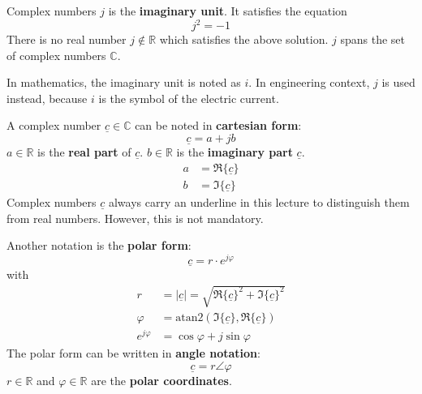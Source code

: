 \begin{refsection}
\begin{excursus}{Complex numbers}
	$j$ is the  \textbf{imaginary unit}. It satisfies the equation
	\begin{equation}
		j^2 = -1
	\end{equation}
	There is no real number $j \notin \mathbb{R}$ which satisfies the above solution. $j$ spans the set of complex numbers $\mathbb{C}$.
	
	In mathematics, the imaginary unit is noted as $i$. In engineering context, $j$ is used instead, because $i$ is the symbol of the electric current.
	
	A complex number $\underline{c} \in \mathbb{C}$ can be noted in  \textbf{cartesian form}:
	\begin{equation}
		\underline{c} = a + j b
	\end{equation}
	$a \in \mathbb{R}$ is the  \textbf{real part} of $\underline{c}$. $b \in \mathbb{R}$ is the  \textbf{imaginary part} $\underline{c}$.
	\begin{subequations}
		\begin{align}
			a &= \Re\{\underline{c}\} \\
			b &= \Im\{\underline{c}\}
		\end{align}
	\end{subequations}
	Complex numbers $\underline{c}$ always carry an underline in this lecture to distinguish them from real numbers. However, this is not mandatory.

	Another notation is the  \textbf{polar form}:
	\begin{equation}
		\underline{c} = r \cdot e^{j \varphi}
	\end{equation}
	with
	\begin{subequations}
		\begin{align}
			r &= |\underline{c}| = \sqrt{\Re\{\underline{c}\}^2 + \Im\{\underline{c}\}^2} \\
			\varphi &= \mathrm{atan2} \left(\Im\{\underline{c}\}, \Re\{\underline{c}\}\right) \\
			e^{j \varphi} &= \cos \varphi + j \sin \varphi
		\end{align}
	\end{subequations}
	The polar form can be written in  \textbf{angle notation}:
	\begin{equation}
		\underline{c} = r \angle \varphi
	\end{equation}
	$r \in \mathbb{R}$ and $\varphi \in \mathbb{R}$ are the  \textbf{polar coordinates}.
\end{excursus}


\end{refsection}
